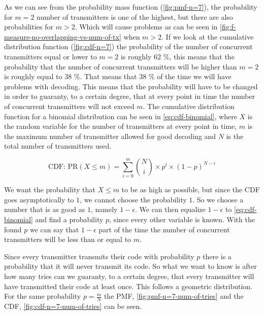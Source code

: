 		As we can see from the probability mass function (\autoref{fig:pmf-n=7}), the probability for $m = 2$ number of transmitters is one of the highest, but there are also probabilities for $m > 2$.
		Which will cause problems as can be seen in \autoref{fig:f-measure-no-overlapping-vs-num-of-tx} when $m > 2$.
		If we look at the cumulative distribution function (\autoref{fig:cdf-n=7}) the probability of the number of concurrent transmitters equal or lower to $m = 2$ is roughly 62 \%, this means that the probability that the number of concurrent transmitters will be higher than $m = 2$ is roughly equal to 38 \%. 
		That means that 38 \% of the time we will have problems with decoding.
		This means that the probability will have to be changed in order to guaranty, to a certain degree, that at every point in time the number of concurrent transmitters will not exceed $m$.
		The cumulative distribution function for a binomial distribution can be seen in \autoref{eq:cdf-binomial}, where $X$ is the random variable for the number of transmitters at every point in time, $m$ is the maximum number of transmitter allowed for good decoding and $N$ is the total number of transmitters used.


		\begin{equation}
			\label{eq:cdf-binomial}
			\text{CDF:  PR}(X \le m) = \displaystyle\sum_{i=0}^{m} \binom Ni \times p^i \times (1 - p)^{N-i}
		\end{equation}

		We want the probability that $X \le m$ to be as high as possible, but since the CDF goes asymptotically to $1$, we cannot choose the probability $1$.
		So we choose a number that is as good as $1$, namely $1 - \epsilon$.
		We can then equalize $1 - \epsilon$ to \autoref{eq:cdf-binomial} and find a probability $p$, since every other variable is known.
		With the found $p$ we can say that $1 - \epsilon$ part of the time the number of concurrent transmitters will be less than or equal to $m$.


		Since every transmitter transmits their code with probability $p$ there is a probability that it will never transmit its code.
		So what we want to know is after how many tries can we guaranty, to a certain degree, that every transmitter will have transmitted their code at least once.
		This follows a geometric distribution.
		For the same probability $p = \frac{m}{N}$ the PMF, \autoref{fig:pmf-n=7-num-of-tries} and the CDF, \autoref{fig:cdf-n=7-num-of-tries} can be seen.

